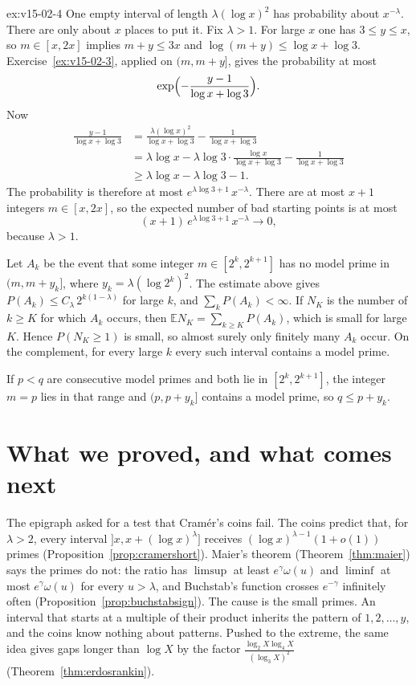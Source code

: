\begin{solution}{ex:v15-02-4}
\idea One empty interval of length \(\lambda(\log x)^2\) has probability about \(x^{-\lambda}\). There are only about \(x\) places to put it.
\writeup Fix \(\lambda>1\). For large \(x\) one has \(3\le y\le x\), so \(m\in[x,2x]\) implies \(m+y\le3x\) and \(\log(m+y)\le\log x+\log3\). Exercise~\ref{ex:v15-02-3}, applied on \((m,m+y]\), gives the probability at most
\[
\exp\Bigl(-\frac{y-1}{\log x+\log3}\Bigr).
\]
Now
\begin{align*}
\frac{y-1}{\log x+\log3}
&=\frac{\lambda(\log x)^2}{\log x+\log3}-\frac1{\log x+\log3}\\
&=\lambda\log x-\lambda\log3\cdot\frac{\log x}{\log x+\log3}-\frac1{\log x+\log3}\\
&\ge\lambda\log x-\lambda\log3-1.
\end{align*}
The probability is therefore at most \(e^{\lambda\log3+1}\,x^{-\lambda}\). There are at most \(x+1\) integers \(m\in[x,2x]\), so the expected number of bad starting points is at most
\[
(x+1)\,e^{\lambda\log3+1}\,x^{-\lambda}\to0,
\]
because \(\lambda>1\).

Let \(A_k\) be the event that some integer \(m\in[2^k,2^{k+1}]\) has no model prime in \((m,m+y_k]\), where \(y_k=\lambda(\log 2^k)^2\). The estimate above gives \(P(A_k)\le C_\lambda\,2^{k(1-\lambda)}\) for large \(k\), and \(\sum_k P(A_k)<\infty\). If \(N_K\) is the number of \(k\ge K\) for which \(A_k\) occurs, then \(\mathbb EN_K=\sum_{k\ge K}P(A_k)\), which is small for large \(K\). Hence \(P(N_K\ge1)\) is small, so almost surely only finitely many \(A_k\) occur. On the complement, for every large \(k\) every such interval contains a model prime.

If \(p<q\) are consecutive model primes and both lie in \([2^k,2^{k+1}]\), the integer \(m=p\) lies in that range and \((p,p+y_k]\) contains a model prime, so \(q\le p+y_k\).
\end{solution}

\section{What we proved, and what comes next}

The epigraph asked for a test that Cram\'er's coins fail. The coins predict that, for $\lambda>2$, every interval $]x,x+(\log x)^\lambda]$ receives $(\log x)^{\lambda-1}(1+o(1))$ primes (Proposition~\ref{prop:cramershort}). Maier's theorem (Theorem~\ref{thm:maier}) says the primes do not: the ratio has $\limsup$ at least $e^\gamma\omega(u)$ and $\liminf$ at most $e^\gamma\omega(u)$ for every $u>\lambda$, and Buchstab's function crosses $e^{-\gamma}$ infinitely often (Proposition~\ref{prop:buchstabsign}). The cause is the small primes. An interval that starts at a multiple of their product inherits the pattern of $1,2,\dots,y$, and the coins know nothing about patterns. Pushed to the extreme, the same idea gives gaps longer than $\log X$ by the factor $\frac{\log_2X\log_4X}{(\log_3X)^2}$ (Theorem~\ref{thm:erdosrankin}).

